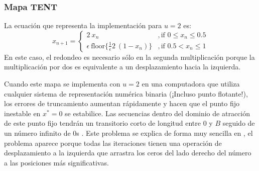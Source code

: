 \subsubsection{Mapa TENT} \label{sssec:tent}

La ecuación que representa la implementación para $u=2$ es:
%
\begin{equation}\label{eq:tent2B2}
x_{n+1} = 
\begin{cases}
2~x_n &, \textrm{if } 0\leq x_n\leq 0.5\\
\epsilon ~\text{floor} \{\frac{1}{\epsilon} 2~(1-x_n)\} &, \textrm{if } 0.5<x_n\leq 1 
\end{cases}	
\end{equation}
%
En este caso, el redondeo es necesario sólo en la segunda multiplicación porque la multiplicación por dos es equivalente a un desplazamiento hacia la izquierda.

Cuando este mapa se implementa con $u=2$ en una computadora que utiliza cualquier sistema de representación numérica binaria (¡Incluso punto flotante!), los errores de truncamiento aumentan rápidamente y hacen que el punto fijo inestable en $x^* = 0$ se estabilice.
Las secuencias dentro del dominio de atracción de este punto fijo tendrán un transitorio corto de longitud entre $0$ y $B$ seguido de un número infinito de $0$s \cite{Jessa2002, Callegari}.
Este problema se explica de forma muy sencilla en \cite{Li2004}, el problema aparece porque todas las iteraciones tienen una operación de desplazamiento a la izquierda que arrastra los ceros del lado derecho del número a las posiciones más significativas.

